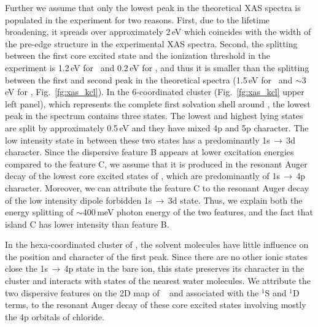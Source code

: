 Further we assume that only the lowest peak in the theoretical XAS spectra is populated in the experiment for two reasons. First, due to the lifetime broadening, it spreads over approximately 2\,eV which coincides with the width of the pre-edge structure in the experimental XAS spectra. Second, the splitting between the first core excited state and the ionization threshold in the experiment is 1.2\,eV for \ki~and 0.2\,eV for \cli, and thus it is smaller than the splitting between the first and second peak in the theoretical spectra (1.5\,eV for \ki~and $\sim$3\,eV for \cli, Fig.\ \ref{fg:xas_kcl}). In the 6-coordinated cluster (Fig.\ \ref{fg:xas_kcl} upper left panel), which represents the complete first solvation shell around \ki, the lowest peak in the spectrum contains three states. The lowest and highest lying states are split by approximately 0.5\,eV and they have mixed 4p and 5p character. The low intensity state in between these two states has a predominantly 1s$\,\rightarrow\,$3d character. Since the dispersive feature B appears at lower excitation energies compared to the feature C, we assume that it is produced in the resonant Auger decay of the lowest core excited states of \ki, which are predominantly of 1s$\,\rightarrow\,$4p character. Moreover, we can attribute the feature C to the resonant Auger decay of the low intensity dipole forbidden 1s$\,\rightarrow\,$3d state. Thus, we explain both the energy splitting of $\sim$400\,meV photon energy of the two features, and the fact that island C has lower intensity than feature B.


In the hexa-coordinated cluster of \cli, the solvent molecules have little influence on the position and character of the first peak. Since there are no other ionic states close the 1s$\,\rightarrow\,$4p state in the bare ion, this state preserves its character in the cluster and interacts with states of the nearest water molecules. We attribute the two dispersive features on the 2D map of \cli~ and associated with the $^{1}$S and $^{1}$D terms, to the resonant Auger decay of these core excited states involving mostly the 4p orbitals of chloride. 


